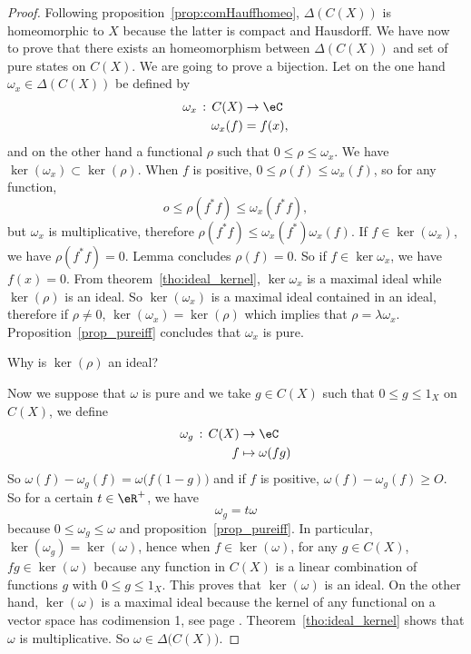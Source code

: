 \begin{proof}
Following proposition~\ref{prop:comHauffhomeo}, $\Delta(C(X))$ is homeomorphic to $X$ because the latter is compact and Hausdorff. We have now to prove that there exists an homeomorphism between $\Delta(C(X))$ and set of pure states on $C(X)$. We are going to prove a bijection. Let on the one hand $\omega_x\in\Delta(C(X))$ be defined by
\begin{equation}
\begin{aligned}
 \omega_x\,:\,C(X)&\to \eC \\
\omega_x(f)&= f(x),
\end{aligned}
\end{equation}
and on the other hand a functional $\rho$ such that $0\leq\rho\leq\omega_x$. We have $\ker(\omega_x)\subset\ker(\rho)$. When $f$ is positive, $0\leq\rho(f)\leq\omega_x(f)$, so for any function,
\[
  o\leq\rho(f^*f)\leq\omega_x(f^*f),
\]
but $\omega_x$ is multiplicative, therefore $\rho(f^*f)\leq\omega_x(f^*)\omega_x(f)$. If $f\in\ker(\omega_x)$, we have $\rho(f^*f)=0$. Lemma concludes $\rho(f)=0$. So if $f\in\ker\omega_x$, we have $f(x)=0$. From theorem~\ref{tho:ideal_kernel}, $\ker\omega_x$ is a maximal ideal while $\ker(\rho)$ is an ideal. So $\ker(\omega_x)$ is a maximal ideal contained in an ideal, therefore if $\rho\neq0$, $\ker(\omega_x)=\ker(\rho)$ which implies that $\rho=\lambda\omega_x$. Proposition~\ref{prop_pureiff} concludes that $\omega_x$ is pure.

\begin{probleme}
    Why is $\ker(\rho)$ an ideal?
\end{probleme}


Now we suppose that $\omega$ is pure and we take  $g\in C(X)$ such that $0\leq g\leq 1_X$ on $C(X)$, we define
\begin{equation}
\begin{aligned}
 \omega_g\,:\,C(X)&\to \eC \\
f&\mapsto \omega(fg)
\end{aligned}
\end{equation}
 So  $\omega(f)-\omega_g(f)=\omega\big( f(1-g) \big)$ and if $f$ is positive, $\omega(f)-\omega_g(f)\geq O$. So for a certain $t\in\eR^+$, we have
\[
  \omega_g=t\omega
\]
 because $0\leq\omega_g\leq\omega$ and proposition~\ref{prop_pureiff}. In particular, $\ker (\omega_g)=\ker(\omega)$, hence when $f\in \ker(\omega)$, for any $g\in C(X)$, $fg \in \ker(\omega)$ because any function in $C(X)$ is a linear combination of functions $g$ with $0\leq g\leq 1_X$. This proves that $\ker (\omega)$ is an ideal. On the other hand, $\ker (\omega)$ is a maximal ideal because the kernel of any functional on a vector space has codimension 1, see page \pageref{pg_codimun}. Theorem~\ref{tho:ideal_kernel} shows that $\omega$ is multiplicative. So $\omega\in\Delta\big( C(X) \big)$.

\end{proof}

